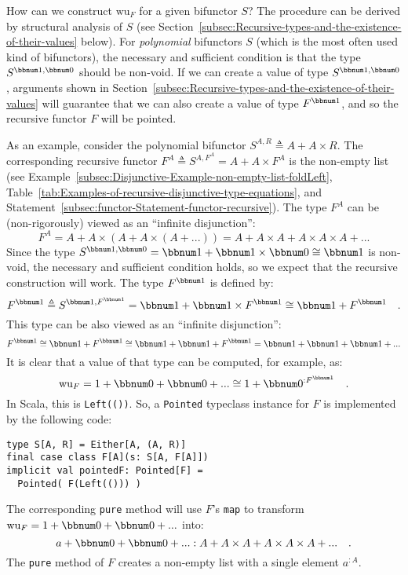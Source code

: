 How can we construct $\text{wu}_{F}$ for a given bifunctor $S$?
The procedure can be derived by structural analysis of $S$ (see Section~\ref{subsec:Recursive-types-and-the-existence-of-their-values}
below). For \emph{polynomial} bifunctors $S$ (which is the most often
used kind of bifunctors), the necessary and sufficient condition is
that the type $S^{\bbnum 1,\bbnum 0}$ should be non-void. If we can
create a value of type $S^{\bbnum 1,\bbnum 0}$ , arguments shown
in Section~\ref{subsec:Recursive-types-and-the-existence-of-their-values}
will guarantee that we can also create a value of type $F^{\bbnum 1}$,
and so the recursive functor $F$ will be pointed.

As an example, consider the polynomial bifunctor $S^{A,R}\triangleq A+A\times R$.
The corresponding recursive functor $F^{A}\triangleq S^{A,F^{A}}=A+A\times F^{A}$
is the non-empty list (see Example~\ref{subsec:Disjunctive-Example-non-empty-list-foldLeft},
Table~\ref{tab:Examples-of-recursive-disjunctive-type-equations},
and Statement~\ref{subsec:functor-Statement-functor-recursive}).
The type $F^{A}$ can be (non-rigorously) viewed as an \textsf{``}infinite
disjunction\textsf{''}:
\[
F^{A}=A+A\times(A+A\times\left(A+...\right))=A+A\times A+A\times A\times A+...
\]
Since the type $S^{\bbnum 1,\bbnum 0}=\bbnum 1+\bbnum 1\times\bbnum 0\cong\bbnum 1$
is non-void, the necessary and sufficient condition holds, so we expect
that the recursive construction will work. The type $F^{\bbnum 1}$
is defined by:
\[
F^{\bbnum 1}\triangleq S^{\bbnum 1,F^{\bbnum 1}}=\bbnum 1+\bbnum 1\times F^{\bbnum 1}\cong\bbnum 1+F^{\bbnum 1}\quad.
\]
This type can be also viewed as an \textsf{``}infinite disjunction\textsf{''}:
\[
F^{\bbnum 1}\cong\bbnum 1+F^{\bbnum 1}\cong\bbnum 1+\bbnum 1+F^{\bbnum 1}=\bbnum 1+\bbnum 1+\bbnum 1+...
\]
It is clear that a value of that type can be computed, for example,
as:
\[
\text{wu}_{F}=1+\bbnum 0+\bbnum 0+...\cong1+\bbnum 0^{:F^{\bbnum 1}}\quad.
\]
In Scala, this is \lstinline!Left(())!. So, a \lstinline!Pointed!
typeclass instance for $F$ is implemented by the following code:
\begin{lstlisting}
type S[A, R] = Either[A, (A, R)]
final case class F[A](s: S[A, F[A]])
implicit val pointedF: Pointed[F] =
  Pointed( F(Left(())) )
\end{lstlisting}

The corresponding \lstinline!pure! method will use $F$\textsf{'}s \lstinline!map!
to transform $\text{wu}_{F}=1+\bbnum 0+\bbnum 0+...$ into:
\[
a+\bbnum 0+\bbnum 0+...:A+A\times A+A\times A\times A+...\quad.
\]
The \lstinline!pure! method of $F$ creates a non-empty list with
a single element $a^{:A}$.

